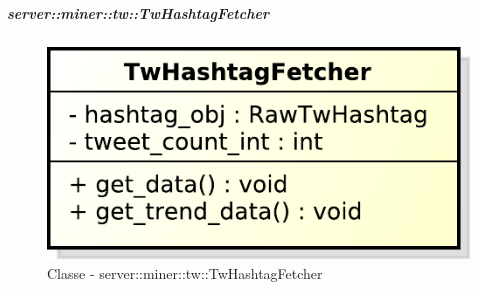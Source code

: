 	\subparagraph{server::miner::tw::TwHashtagFetcher} %
		\label{subp:server_miner_tw_TwHashtagFetcher}
		    \begin{figure}[!htbp]
 		 		\centering
 				\centerline{\includegraphics[scale=0.75]{./images/server/classes/miner/tw_hashtag_fetcher.pdf}}
 				\caption{Classe - server::miner::tw::TwHashtagFetcher}
			\end{figure}
